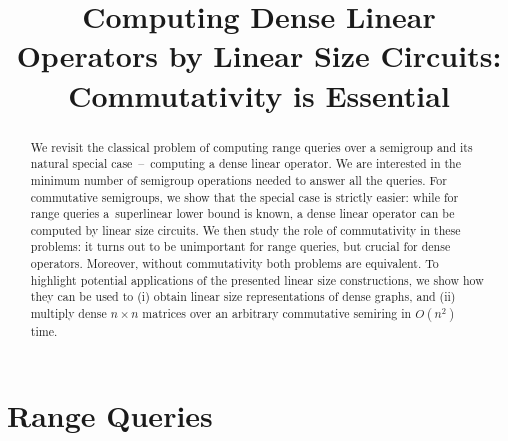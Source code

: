 \documentclass[11pt,letterpaper]{article}
\begin{document}
\sloppy
\author{}
\title{Computing Dense Linear Operators by Linear Size Circuits: Commutativity is Essential}
\maketitle


\begin{abstract}

We revisit the classical problem of computing range queries over a semigroup and
its natural special case~--~computing a dense linear operator. We are interested
in the minimum number of semigroup operations needed to answer all the queries.
For commutative semigroups, we show that the special case is strictly easier:
while for range queries a~superlinear lower bound is known, a dense linear
operator can be computed by linear size circuits. We then study the role of
commutativity in these problems: it turns out to be unimportant for range
queries, but crucial for dense operators. Moreover, without commutativity both
problems are equivalent. To highlight potential applications of the presented
linear size constructions, we show how they can be used to (i) obtain linear
size representations of dense graphs, and (ii) multiply dense $n\times n$
matrices over an arbitrary commutative semiring in $O(n^2)$ time.
\end{abstract}

\tableofcontents

\section{Range Queries}
\end{document}
